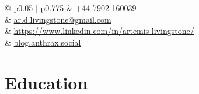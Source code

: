 \documentclass[
	9pt, %
]{FreemanCV}
\begin{document}
\begin{paracol}{2}
	



\switchcolumn %


\parbox[top][0.08\textheight][c]{\linewidth}{ %
	\colorbox{shade}{ %
		\begin{supertabular}{@{\hspace{3pt}} p{0.05\linewidth} | p{0.775\linewidth}} %
			\raisebox{-1pt}{\faPhone} & +44 7902 160039 \\ %
			\raisebox{-1pt}{\small\faEnvelope} & \href{mailto:ar.d.livingstone@gmail.com}{ar.d.livingstone@gmail.com} \\ %
			\raisebox{-1pt}{\faLinkedinSquare} & \href{https://www.linkedin.com/in/artemis-livingstone/}{https://www.linkedin.com/in/artemis-livingstone/} \\ %
			\raisebox{-1pt}{\small\faDesktop} & \href{https://blog.anthrax.social}{blog.anthrax.social} \\ %
		\end{supertabular}
	}
	\vfill %
}


\section{Education} 


\end{paracol}
\end{document}
